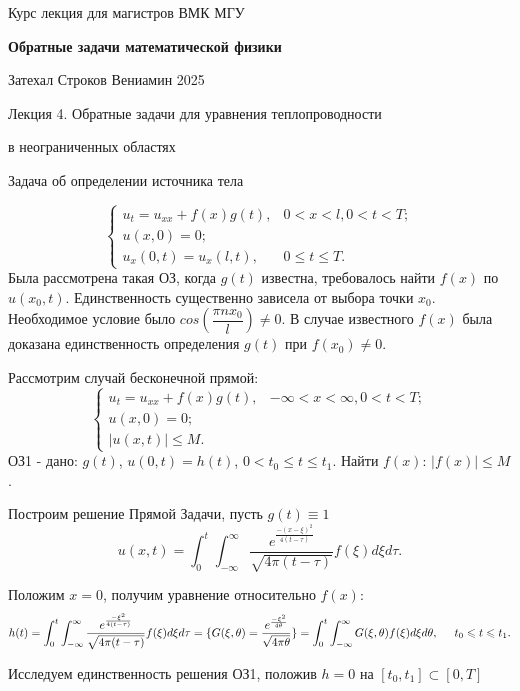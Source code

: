 \documentclass{article}
\begin{document}
\centerline{\large Курс лекция для магистров ВМК МГУ}
\centerline {\textbf{\LARGE Обратные задачи математической физики}}
\centerline {Затехал Строков Вениамин 2025}

\vspace{0.4cm}

\centerline{\LARGE 	Лекция 4. Обратные задачи для уравнения теплопроводности}
\centerline{\LARGE 	в неограниченных областях}

\vspace{0.5cm}
\centerline{\large Задача об определении источника тела}

\[
\begin{cases}
u_t = u_{xx} + f(x) g(t), & 0 < x < l, 0 < t < T;\\
u(x,0) = 0;\\
u_x(0,t) = u_x(l,t), & 0 \leqslant t \leqslant T.
\end{cases}
\]
Была рассмотрена такая ОЗ, когда $g(t) $ известна, требовалось найти $f(x)$  по $u(x_0,t)$.
 Единственность существенно зависела от выбора точки $x_0$. Необходимое условие было $cos(\dfrac{\pi n x_0}{l}) \neq 0$. 
 В случае известного $f(x)$ была доказана единственность определения $g(t)$ при $f(x_0) \neq 0$.
 
Рассмотрим случай бесконечной прямой:
\[
\begin{cases}
u_t = u_{xx} + f(x) g(t), & -\infty < x < \infty, 0 < t < T;\\
u(x,0) = 0;\\
|u(x,t)| \leqslant M.
\end{cases}
\]
ОЗ1 - дано: $g(t)$, $u(0,t) = h(t)$, $0 < t_0 \leqslant t \leqslant t_1$. 
Найти $f(x)$: $|f(x)| \leqslant M$.

Построим решение Прямой Задачи, пусть $g(t) \equiv 1$
\[
u(x,t) = \int_0^t \int_{-\infty}^{\infty} \dfrac{e^{\frac{-(x-\xi)^2}{4(t-\tau)}}}{\sqrt{4 \pi (t -\tau)}}  f(\xi) d\xi d \tau.
\]

Положим $x = 0$, получим уравнение относительно $f(x)$:
\begin{equation}
h(t) = \int_0^t \int_{-\infty}^{\infty} \dfrac{e^{\frac{-\xi^2}{4(t-\tau)}}}{\sqrt{4 \pi (t -\tau)}}  f(\xi) d\xi d \tau = 
\{ G(\xi,\theta) = \dfrac{e^{\frac{-\xi^2}{4 \theta}}}{\sqrt{4 \pi \theta}} \} =
\int_0^t \int_{-\infty}^{\infty} G(\xi, \theta) f(\xi) d\xi d \theta,
 \hspace{0.5cm} t_0 \leqslant t \leqslant t_1.
\end{equation}

Исследуем единственность решения ОЗ1, положив $h=0$ на $[t_0,t_1] \subset [0,T]$
\end{document}
